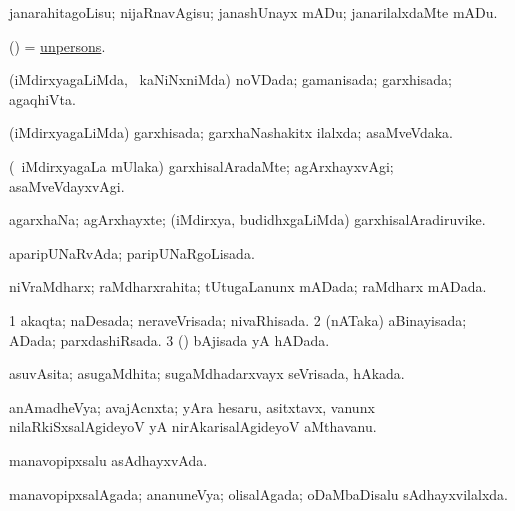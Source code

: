 \bentry
{} 
\gl{\sakirx}
\expl{}
\bmng
janarahitagoLisu; nijaRnavAgisu; janashUnayx mADu; janarilalxdaMte mADu. 
\emng
\eentry

\bentry
{} 
\gl{\nA}
\expl{}
\bmng
(\bava) = \hyperlink{unperson}{unpersons}. 
\emng
\eentry

\bentry
{} 
\gl{\gu}
\expl{}
\bmng
(iMdirxyagaLiMda, \kanmu\ kaNiNxniMda) noVDada; gamanisada; garxhisada; agaqhiVta. 
\emng
\eentry

\bentry
{} 
\gl{\gu}
\expl{}
\bmng
(iMdirxyagaLiMda) garxhisada; garxhaNashakitx ilalxda; asaMveVdaka. 
\emng
\eentry

\bentry
{} 
\gl{\kirxvi}
\expl{}
\bmng
(\kanmu\ iMdirxyagaLa mUlaka) garxhisalAradaMte; agArxhayxvAgi; asaMveVdayxvAgi. 
\emng
\eentry

\bentry
{} 
\gl{\nA}
\expl{}
\bmng
agarxhaNa; agArxhayxte; (iMdirxya, budidhxgaLiMda) garxhisalAradiruvike. 
\emng
\eentry

\bentry
{} 
\gl{\gu}
\expl{}
\bmng
aparipUNaRvAda; paripUNaRgoLisada. 
\emng
\eentry

\bentry
{} 
\gl{\gu}
\expl{}
\bmng
niVraMdharx; raMdharxrahita; tUtugaLanunx mADada; raMdharx mADada. 
\emng
\eentry

\bentry
{} 
\gl{\gu}
\expl{}
\bmng
\bnum
\num{1} akaqta; naDesada; neraveVrisada; nivaRhisada. 
\num{2} (nATaka) aBinayisada; ADada; parxdashiRsada. 
\num{3} (\saM) bAjisada yA hADada. 
\enum
\emng
\eentry

\bentry
{} 
\gl{\gu}
\expl{}
\bmng
asuvAsita; asugaMdhita; sugaMdhadarxvayx seVrisada, hAkada. 
\emng
\eentry

\bentry
{} 
\gl{\nA}
\expl{}
\bmng
anAmadheVya; avajAcnxta; yAra hesaru, asitxtavx, \mo vanunx nilaRkiSxsalAgideyoV yA nirAkarisalAgideyoV aMthavanu. 
\emng
\eentry

\bentry
{} 
\gl{\gu}
\expl{}
\bmng
manavopipxsalu asAdhayxvAda. 
\emng
\eentry

\bentry
{} 
\gl{\gu}
\expl{}
\bmng
manavopipxsalAgada; ananuneVya; olisalAgada; oDaMbaDisalu sAdhayxvilalxda. 
\emng
\eentry

